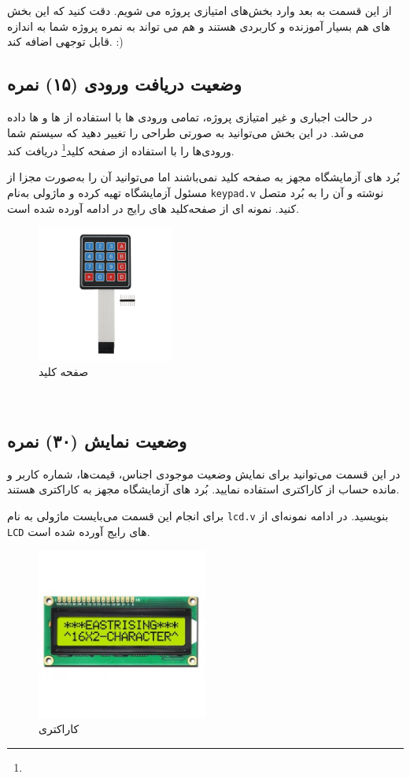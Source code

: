 \documentclass[]{article}
\begin{document}
از این قسمت به بعد وارد بخش‌های امتیازی پروژه می شویم. دقت کنید که این بخش های هم بسیار آموزنده و کاربردی هستند و هم می تواند به نمره پروژه شما به اندازه قابل توجهی اضافه کند. :)


\subsection*{{\titr وضعیت دریافت ورودی} (۱۵) نمره}
در حالت اجباری و غیر امتیازی پروژه، تمامی ورودی ها با استفاده از  ها و  ها داده می‌شد. در این بخش می‌توانید به صورتی طراحی را تغییر دهید که سیستم شما ورودی‌ها را با استفاده از صفحه کلید\footnote{} دریافت کند.

بُرد های آزمایشگاه مجهز به صفحه کلید نمی‌باشند اما می‌توانید آن را به‌صورت مجزا از مسئول آزمایشگاه تهیه کرده و ماژولی به‌نام \texttt{keypad.v} نوشته و آن را به بُرد متصل کنید. نمونه ای از صفحه‌کلید های رایج در ادامه آورده شده است.


\begin{figure}[h]
	\centering
	\includegraphics[width=0.4\textwidth]{images/keypad.png}
	\caption{صفحه کلید}
	\label{صفحه کلید}
\end{figure}




\newpage
\Large \textbf{\\
}




\subsection*{{\titr وضعیت نمایش} (۳۰) نمره}
در این قسمت می‌توانید برای نمایش وضعیت موجودی اجناس، قیمت‌ها، شماره کاربر و مانده حساب از  کاراکتری استفاده نمایید. بُرد های آزمایشگاه مجهز به  کاراکتری هستند. 

برای انجام این قسمت می‌بایست ماژولی به نام \texttt{lcd.v} بنویسید. در ادامه نمونه‌ای از \texttt{LCD} های رایج آورده شده است.


\begin{figure}[h]
	\centering
	\includegraphics[width=0.5\textwidth]{images/lcd.jpg}
	\caption{ کاراکتری}
	\label{LCD کاراکتری}
\end{figure}
\end{document}
